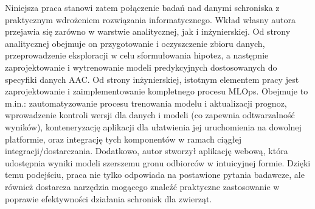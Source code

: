 Niniejsza praca stanowi zatem połączenie badań nad danymi schroniska z praktycznym wdrożeniem rozwiązania informatycznego. Wkład własny autora przejawia się zarówno w warstwie analitycznej, jak i inżynierskiej. Od strony analitycznej obejmuje on przygotowanie i oczyszczenie zbioru danych, przeprowadzenie eksploracji w celu sformułowania hipotez, a następnie zaprojektowanie i wytrenowanie modeli predykcyjnych dostosowanych do specyfiki danych AAC. Od strony inżynierskiej, istotnym elementem pracy jest zaprojektowanie i zaimplementowanie kompletnego procesu MLOps. Obejmuje to m.in.: zautomatyzowanie procesu trenowania modelu i aktualizacji prognoz, wprowadzenie kontroli wersji dla danych i modeli (co zapewnia odtwarzalność wyników), konteneryzację aplikacji dla ułatwienia jej uruchomienia na dowolnej platformie, oraz integrację tych komponentów w ramach ciągłej integracji/dostarczania. Dodatkowo, autor stworzył aplikację webową, która udostępnia wyniki modeli szerszemu gronu odbiorców w intuicyjnej formie. Dzięki temu podejściu, praca nie tylko odpowiada na postawione pytania badawcze, ale również dostarcza narzędzia mogącego znaleźć praktyczne zastosowanie w poprawie efektywności działania schronisk dla zwierząt.
